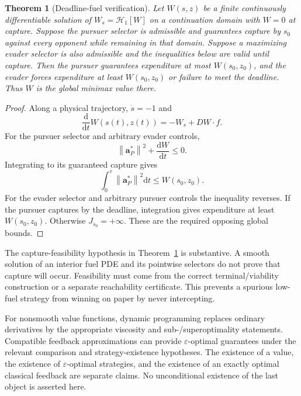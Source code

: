 \documentclass[journal,a4paper]{IEEEtran}
\newtheorem{theorem}{Theorem}
\newcommand{\HH}{\mathcal H}
\newcommand{\norm}[1]{\left\|#1\right\|}
\newcommand{\dd}{\mathrm d}
\begin{document}
\begin{theorem}[Deadline-fuel verification]
\label{thm:fuel}
Let $W(s,z)$ be a finite continuously differentiable solution of $W_s=\HH_1[W]$ on a continuation domain with $W=0$ at capture. Suppose the pursuer selector is admissible and guarantees capture by $s_0$ against every opponent while remaining in that domain. Suppose a maximizing evader selector is also admissible and the inequalities below are valid until capture. Then the pursuer guarantees expenditure at most $W(s_0,z_0)$, and the evader forces expenditure at least $W(s_0,z_0)$ or failure to meet the deadline. Thus $W$ is the global minimax value there.
\end{theorem}
\begin{proof}
Along a physical trajectory, $\dot s=-1$ and
\begin{equation}
 \frac{\dd}{\dd t}W(s(t),z(t))=-W_s+DW\cdot f.
\end{equation}
For the pursuer selector and arbitrary evader controls,
\begin{equation}
 \norm{\mathbf a_P^*}^2+\frac{\dd W}{\dd t}\le0.
 \label{eq:Wupper}
\end{equation}
Integrating to its guaranteed capture gives
\begin{equation}
 \int_0^\tau\norm{\mathbf a_P^*}^2\dd t\le W(s_0,z_0).
\end{equation}
For the evader selector and arbitrary pursuer controls the inequality reverses. If the pursuer captures by the deadline, integration gives expenditure at least $W(s_0,z_0)$. Otherwise $J_{s_0}=+\infty$. These are the required opposing global bounds.
\end{proof}

The capture-feasibility hypothesis in Theorem~\ref{thm:fuel} is substantive. A smooth solution of an interior fuel PDE and its pointwise selectors do not prove that capture will occur. Feasibility must come from the correct terminal/viability construction or a separate reachability certificate. This prevents a spurious low-fuel strategy from winning on paper by never intercepting.

For nonsmooth value functions, dynamic programming replaces ordinary derivatives by the appropriate viscosity and sub-/superoptimality statements. Compatible feedback approximations can provide $\varepsilon$-optimal guarantees under the relevant comparison and strategy-existence hypotheses. The existence of a value, the existence of $\varepsilon$-optimal strategies, and the existence of an exactly optimal classical feedback are separate claims. No unconditional existence of the last object is asserted here.
\end{document}
